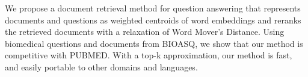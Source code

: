 We propose a document retrieval method for question answering that represents documents and questions as weighted centroids of word embeddings and reranks the retrieved documents with a relaxation of Word Mover's Distance. Using biomedical questions and documents from BIOASQ, we show that our method is competitive with PUBMED. With a top-k approximation, our method is fast, and easily portable to other domains and languages.
